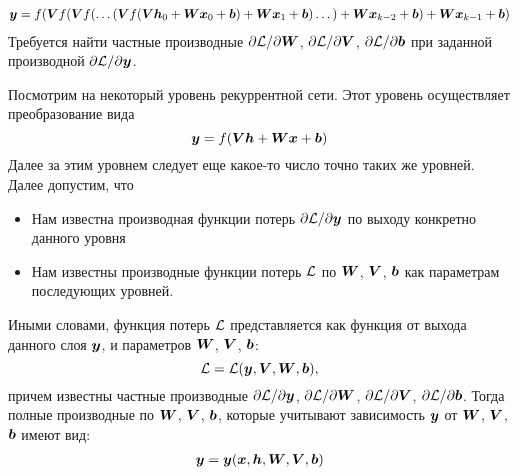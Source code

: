 \documentclass{report}
\numberwithin{theorem}{chapter}
\numberwithin{statement}{chapter}
\numberwithin{lemma}{chapter}
\theoremstyle{definition}
\numberwithin{task}{chapter}
\theoremstyle{remark}
\numberwithin{example}{chapter}
\theoremstyle{definition}
\numberwithin{definition}{chapter}
\theoremstyle{remark}
\theoremstyle{remark}
\numberwithin{lyrics}{section}
\begin{document}
\begin{gather*}
\boldsymbol{y} = f(\boldsymbol{V} f(\boldsymbol{V} f( \dots (\boldsymbol{V} f(\boldsymbol{V} \boldsymbol{h}_0 + \boldsymbol{W} \boldsymbol{x}_0 + \boldsymbol{b}) + \boldsymbol{W} \boldsymbol{x}_1 + \boldsymbol{b}) \dots) +  \boldsymbol{W} \boldsymbol{x}_{k-2} + \boldsymbol{b} ) + \boldsymbol{W} \boldsymbol{x}_{k-1} + \boldsymbol{b})
\end{gather*}
Требуется найти частные производные $\partial \mathcal{L} / \partial \boldsymbol{W}$, $\partial \mathcal{L} / \partial \boldsymbol{V}$, $\partial \mathcal{L} / \partial \boldsymbol{b}$ при заданной производной $\partial \mathcal{L} / \partial \boldsymbol{y}$.

Посмотрим на некоторый уровень рекуррентной сети. Этот уровень осуществляет преобразование вида
\begin{equation*}
\boldsymbol{y} = f(\boldsymbol{V} \boldsymbol{h} + \boldsymbol{W} \boldsymbol{x} + \boldsymbol{b})
\end{equation*}
Далее за этим уровнем следует еще какое-то число точно таких же уровней. Далее допустим, что 
\begin{itemize}
	\item Нам известна производная функции потерь $\partial \mathcal{L} / \partial \boldsymbol{y}$ по выходу конкретно данного уровня
	\item Нам известны производные функции потерь $\mathcal{L}$ по $\boldsymbol{W}$, $\boldsymbol{V}$, $\boldsymbol{b}$ как параметрам последующих уровней.
\end{itemize}
Иными словами, функция потерь $\mathcal{L}$ представляется как функция от выхода данного слоя $\boldsymbol{y}$, и параметров $\boldsymbol{W}$, $\boldsymbol{V}$, $\boldsymbol{b}$:
$$
\mathcal{L} = \mathcal{L}(\boldsymbol{y}, \boldsymbol{V}, \boldsymbol{W}, \boldsymbol{b}),
$$
причем известны частные производные $\partial \mathcal{L} / \partial \boldsymbol{y}$, $\partial \mathcal{L}/ \partial \boldsymbol{W}$, $\partial \mathcal{L} / \partial \boldsymbol{V}$, $\partial \mathcal{L} / \partial \boldsymbol{b}$. Тогда полные производные по $\boldsymbol{W}$, $\boldsymbol{V}$, $\boldsymbol{b}$, которые учитывают зависимость $\boldsymbol{y}$ от $\boldsymbol{W}$, $\boldsymbol{V}$, $\boldsymbol{b}$ имеют вид:
\begin{gather*}
\boldsymbol{y} = \boldsymbol{y}(\boldsymbol{x}, \boldsymbol{h}, \boldsymbol{W}, \boldsymbol{V}, \boldsymbol{b})
\end{gather*}
\end{document}
